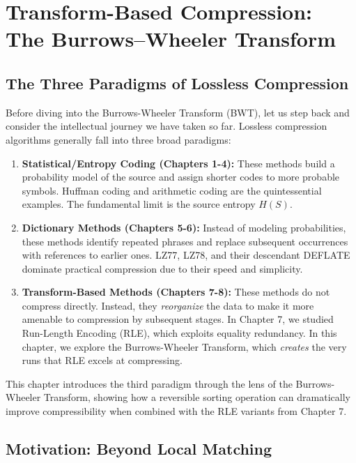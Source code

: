 
\section{Transform-Based Compression: The Burrows--Wheeler Transform}
\label{sec:bwt}

\subsection{The Three Paradigms of Lossless Compression}

Before diving into the Burrows-Wheeler Transform (BWT), let us step back and consider the intellectual journey we have taken so far. Lossless compression algorithms generally fall into three broad paradigms:

\begin{enumerate}
    \item \textbf{Statistical/Entropy Coding (Chapters 1-4):} These methods build a probability model of the source and assign shorter codes to more probable symbols. Huffman coding and arithmetic coding are the quintessential examples. The fundamental limit is the source entropy \(H(S)\).
    
    \item \textbf{Dictionary Methods (Chapters 5-6):} Instead of modeling probabilities, these methods identify repeated phrases and replace subsequent occurrences with references to earlier ones. LZ77, LZ78, and their descendant DEFLATE dominate practical compression due to their speed and simplicity.
    
    \item \textbf{Transform-Based Methods (Chapters 7-8):} These methods do not compress directly. Instead, they \emph{reorganize} the data to make it more amenable to compression by subsequent stages. In Chapter 7, we studied Run-Length Encoding (RLE), which exploits equality redundancy. In this chapter, we explore the Burrows-Wheeler Transform, which \emph{creates} the very runs that RLE excels at compressing.
\end{enumerate}

This chapter introduces the third paradigm through the lens of the Burrows-Wheeler Transform, showing how a reversible sorting operation can dramatically improve compressibility when combined with the RLE variants from Chapter 7.

\subsection{Motivation: Beyond Local Matching}

